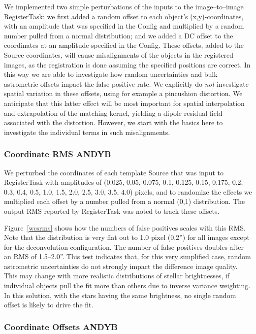 \documentclass[prd, nofootinbib, floatfix, 11pt,tightenlines,times]{article}
\begin{document}
We implemented two simple perturbations of the inputs to the
image--to--image RegisterTask: we first added a random offset to each
object's (x,y)-coordinates, with an amplitude that was specified in
the Config and multiplied by a random number pulled from a normal
distribution; and we added a DC offset to the coordinates at an
amplitude specified in the Config.  These offsets, added to the Source
coordinates, will cause misalignments of the objects in the registered
images, as the registration is done assuming the specified positions
are correct.  In this way we are able to investigate how random
uncertainties and bulk astrometric offsets impact the false positive
rate.  We explicitly do {\it not} investigate spatial variation in
these offsets, using for example a pincushion distortion.  We
anticipate that this latter effect will be most important for spatial
interpolation and extrapolation of the matching kernel, yielding a
dipole residual field associated with the distortion.  However, we
start with the basics here to investigate the individual terms in such
misalignments.

\subsubsection{Coordinate RMS {\bf ANDYB}}

We perturbed the coordinates of each template Source that was input to
RegisterTask with amplitudes of (0.025, 0.05, 0.075, 0.1, 0.125, 0.15,
0.175, 0.2, 0.3, 0.4, 0.5, 1.0, 1.5, 2.0, 2.5, 3.0, 3.5, 4.0) pixels,
and to randomize the effects we multiplied each offset by a number
pulled from a normal (0,1) distribution.  The output RMS reported by
RegisterTask was noted to track these offsets.  

Figure~\ref{wcsrms} shows how the numbers of false positives scales
with this RMS.  Note that the distribution is very flat out to 1.0
pixel (0.2'') for all images except for the deconvolution
configuration.  The number of false positives doubles after an RMS of
1.5--2.0''.  This test indicates that, for this very simplified case,
random astrometric uncertainties do not strongly impact the difference
image quality.  This may change with more realistic distributions of
stellar brightnesses, if individual objects pull the fit more than
others due to inverse variance weighting.  In this solution, with the
stars having the same brightness, no single random offset is likely to
drive the fit.

\subsubsection{Coordinate Offsets {\bf ANDYB}}
\end{document}
